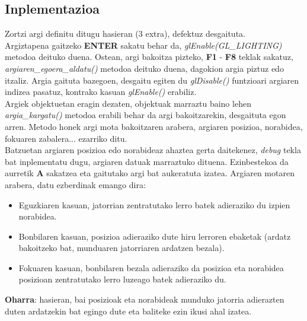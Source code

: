 \documentclass[12pt]{article}
\newcommand{\metodo}[1] {\textit{#1}}
\newcommand{\tekla}[1] {\textbf{#1}}
\begin{document}
\subsection{Inplementazioa}

Zortzi argi definitu ditugu hasieran (3 extra), defektuz desgaituta.\\
Argiztapena gaitzeko \tekla{ENTER} sakatu behar da, \metodo{glEnable(GL\_LIGHTING)} metodoa deituko duena. Ostean, argi bakoitza pizteko, \tekla{F1} - \tekla{F8} teklak sakatuz, \metodo{argiaren\_egoera\_aldatu()} metodoa deituko duena, dagokion argia piztuz edo itzaliz. Argia gaituta bazegoen, desgaitu egiten du \metodo{glDisable()} funtzioari argiaren indizea pasatuz, kontrako kasuan \metodo{glEnable()} erabiliz.\\

Argiek objektuetan eragin dezaten, objektuak marraztu baino lehen \metodo{argia\_kargatu()} metodoa erabili behar da argi bakoitzarekin, desgaituta egon arren. Metodo honek argi mota bakoitzaren arabera, argiaren posizioa, norabidea, fokuaren zabalera... ezarriko ditu.\\

Batzuetan argiaren posizioa edo norabideaz ahaztea gerta daitekenez, \textit{debug} tekla bat inplementatu dugu, argiaren datuak marraztuko dituena. Ezinbestekoa da aurretik \tekla{A} sakatzea eta gaitutako argi bat aukeratuta izatea. Argiaren motaren arabera, datu ezberdinak emango dira:

\begin{itemize}

\item Eguzkiaren kasuan, jatorrian zentratutako lerro batek adieraziko du izpien norabidea.

\item Bonbilaren kasuan, posizioa adieraziko dute hiru lerroren ebaketak (ardatz bakoitzeko bat, munduaren jatorriaren ardatzen bezala).

\item Fokuaren kasuan, bonbilaren bezala adieraziko da posizioa eta norabidea posizioan zentratutako lerro luzeago batek adieraziko du.

\end{itemize}

\textbf{Oharra}: hasieran, bai posizioak eta norabideak munduko jatorria adierazten duten ardatzekin bat egingo dute eta baliteke ezin ikusi ahal izatea.\\
\end{document}
